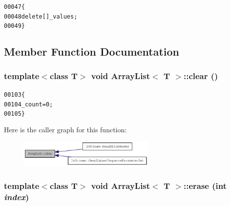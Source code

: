 \begin{footnotesize}\begin{alltt}
00047                      \{
00048                 \textcolor{keyword}{delete}[] \_values;
00049         \}
\end{alltt}\end{footnotesize}




\subsection{Member Function Documentation}
\hypertarget{class_array_list_acb53d54675318c94332d0ec8b6819eb3}{
\subsubsection[{clear}]{\setlength{\rightskip}{0pt plus 5cm}template$<$class T$>$ void {\bf ArrayList}$<$ T $>$::clear ()}}
\label{class_array_list_acb53d54675318c94332d0ec8b6819eb3}




\begin{footnotesize}\begin{alltt}
00103         \{
00104                 \_count = 0;
00105         \}
\end{alltt}\end{footnotesize}




Here is the caller graph for this function:\nopagebreak
\begin{figure}[H]
\begin{center}
\leavevmode
\includegraphics[width=191pt]{class_array_list_acb53d54675318c94332d0ec8b6819eb3_icgraph}
\end{center}
\end{figure}


\hypertarget{class_array_list_a18695cf2c26e9c6ef585ec77afc19fc6}{
\subsubsection[{erase}]{\setlength{\rightskip}{0pt plus 5cm}template$<$class T$>$ void {\bf ArrayList}$<$ T $>$::erase (int {\em index})}}
\label{class_array_list_a18695cf2c26e9c6ef585ec77afc19fc6}




